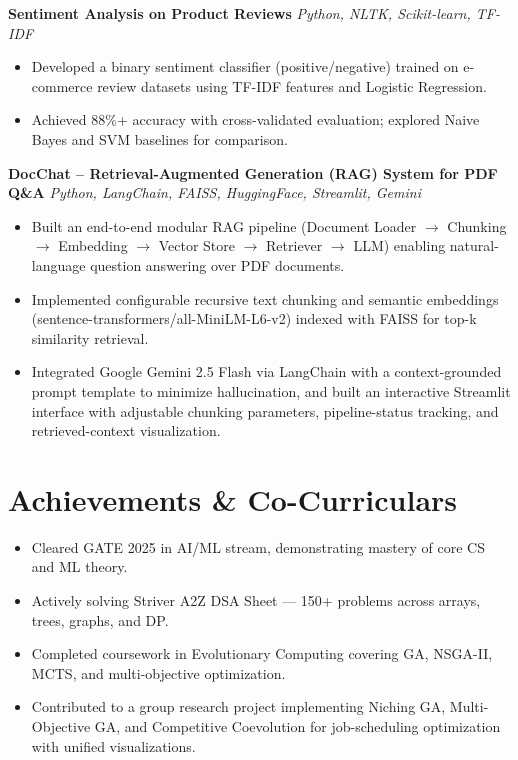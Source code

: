 \documentclass[10.5pt,a4paper]{article}
\begin{document}
\vspace{2pt}
\textbf{Sentiment Analysis on Product Reviews} \hfill \textit{Python, NLTK, Scikit-learn, TF-IDF}
\begin{itemize}
    \item Developed a binary sentiment classifier (positive/negative) trained on e-commerce review datasets using TF-IDF features and Logistic Regression.
    \item Achieved 88\%+ accuracy with cross-validated evaluation; explored Naive Bayes and SVM baselines for comparison.
\end{itemize}

\vspace{2pt}
\textbf{DocChat -- Retrieval-Augmented Generation (RAG) System for PDF Q\&A} \hfill \textit{Python, LangChain, FAISS, HuggingFace, Streamlit, Gemini}
\begin{itemize}
    \item Built an end-to-end modular RAG pipeline (Document Loader $\rightarrow$ Chunking $\rightarrow$ Embedding $\rightarrow$ Vector Store $\rightarrow$ Retriever $\rightarrow$ LLM) enabling natural-language question answering over PDF documents.
    \item Implemented configurable recursive text chunking and semantic embeddings (sentence-transformers/all-MiniLM-L6-v2) indexed with FAISS for top-k similarity retrieval.
    \item Integrated Google Gemini 2.5 Flash via LangChain with a context-grounded prompt template to minimize hallucination, and built an interactive Streamlit interface with adjustable chunking parameters, pipeline-status tracking, and retrieved-context visualization.
\end{itemize}

\section*{Achievements \& Co-Curriculars}
\begin{itemize}
    \item Cleared GATE 2025 in AI/ML stream, demonstrating mastery of core CS and ML theory.
    \item Actively solving Striver A2Z DSA Sheet --- 150+ problems across arrays, trees, graphs, and DP.
    \item Completed coursework in Evolutionary Computing covering GA, NSGA-II, MCTS, and multi-objective optimization.
    \item Contributed to a group research project implementing Niching GA, Multi-Objective GA, and Competitive Coevolution for job-scheduling optimization with unified visualizations.
    
\end{itemize}
\end{document}
